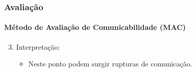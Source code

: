 \documentclass[14pt,beamer]{beamer}
\begin{document}
\begin{frame}
	\frametitle{Avaliação}
	\framesubtitle{Método de Avaliação de Comunicabilidade (MAC)}

	\begin{enumerate} \setcounter{enumi}{2}
        \item Interpretação:
            \begin{itemize}
                \item Neste ponto podem surgir rupturas de comunicação.
            \end{itemize}
	\end{enumerate}


\end{frame}
\end{document}
